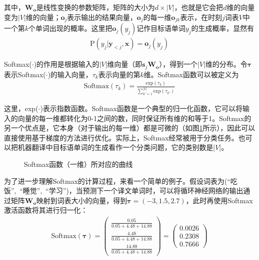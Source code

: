 \noindent 其中，$\mathbf{W_o} $是线性变换的参数矩阵，矩阵的大小为$d \times |V|$，也就是它会把$d$维的向量变为$|V|$维的向量；$\mathbf{o}_j$表示输出的结果向量，$\mathbf{o}_j$的每一维$\mathbf{o}_{jk}$表示，在时刻$j$词表$V$中一个第$k$个单词出现的概率。这里把$\mathbf{o}_j(y_j)$记作目标语单词$y_j$的生成概率，显然有
\begin{eqnarray}
\textrm{P} (y_j| \mathbf{y}_{<j},\mathbf{x})=\mathbf{o}_j(y_j)
\label{eq:6-8}
\end{eqnarray}

\parinterval Softmax($\cdot$)的作用是根据输入的$|V|$维向量（即$\mathbf{s}_j \mathbf{W_o}$），得到一个$|V|$维的分布。令$\mathbf{\tau}$表示Softmax($\cdot$)的输入向量，$\tau_k$表示向量的第$k$维。Softmax函数可以被定义为
\begin{eqnarray}
\textrm{Softmax}(\tau_k)=\frac{\textrm{exp}(\tau_k)}  {\sum_{k'=1}^{|V|} \textrm{exp}(\tau_{k'})}
\label{eq:6-9}
\end{eqnarray}

\noindent 这里，exp($\cdot$)表示指数函数。Softmax函数是一个典型的归一化函数，它可以将输入的向量的每一维都转化为0-1之间的数，同时保证所有维的和等于1。Softmax的另一个优点是，它本身（对于输出的每一维）都是可微的（如图\ref{fig:6-14}所示），因此可以直接使用基于梯度的方法进行优化。实际上，Softmax经常被用于分类任务。也可以把机器翻译中目标语单词的生成看作一个分类问题，它的类别数是|$V$|。

\begin{figure}[htp]
\centering

\caption{ Softmax函数（一维）所对应的曲线}
\label{fig:6-14}
\end{figure}

\parinterval 为了进一步理解Softmax的计算过程，来看一个简单的例子。假设词表为(``吃饭'',\ ``睡觉'',\ ``学习'')，当预测下一个译文单词时，可以将循环神经网络的输出通过矩阵$\mathbf{W_o}$映射到词表大小的向量，得到$\mathbf{\tau}=(-3,1.5,2.7)$，此时再使用Softmax激活函数将其进行归一化：
\begin{eqnarray}
\textrm{Softmax}(\mathbf{\tau})=
\left( \begin{array}{c}
\frac{0.05}{0.05+4.48+14.88} \\
\frac{4.48}{0.05+4.48+14.88} \\
\frac{14.88}{0.05+4.48+14.88}
\end{array} \right)
=
\left( \begin{array}{c}
0.0026 \\
0.2308 \\
0.7666
\end{array} \right)
\label{eq:6-10}
\end{eqnarray}

